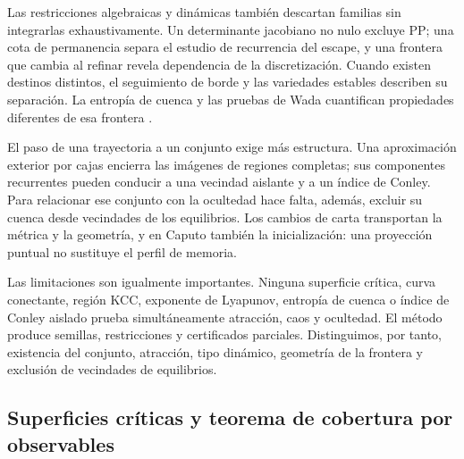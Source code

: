 Las restricciones algebraicas y dinámicas también descartan familias sin
integrarlas exhaustivamente. Un determinante jacobiano no nulo excluye PP;
una cota de permanencia separa el estudio de recurrencia del escape, y una
frontera que cambia al refinar revela dependencia de la discretización.
Cuando existen destinos distintos, el seguimiento de borde y las variedades
estables describen su separación. La entropía de cuenca y las pruebas de
Wada cuantifican propiedades diferentes de esa frontera
\cite{DazaEtAl2016BasinEntropy,DazaEtAl2015Wada}.

El paso de una trayectoria a un conjunto exige más estructura. Una
aproximación exterior por cajas encierra las imágenes de regiones completas;
sus componentes recurrentes pueden conducir a una vecindad aislante y a un
índice de Conley. Para relacionar ese conjunto con la ocultedad hace falta,
además, excluir su cuenca desde vecindades de los equilibrios. Los cambios de
carta transportan la métrica y la geometría, y en Caputo también la
inicialización: una proyección puntual no sustituye el perfil de memoria.

Las limitaciones son igualmente importantes. Ninguna superficie crítica,
curva conectante, región KCC, exponente de Lyapunov, entropía de cuenca o índice
de Conley aislado prueba simultáneamente atracción, caos y ocultedad. El método
produce semillas, restricciones y certificados parciales. Distinguimos, por tanto, existencia del conjunto, atracción, tipo dinámico,
geometría de la frontera y exclusión de vecindades de equilibrios.

\subsection{Superficies críticas y teorema de cobertura por observables}
\label{subsec:gt-superficies}

